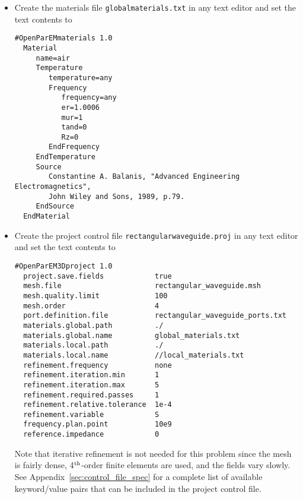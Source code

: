 \documentclass[titlepage]{article}
\renewcommand\_{\textunderscore\linebreak[1]}
\begin{document}
\begin{itemize}

\item Create the materials file \texttt{global\_materials.txt} in any text editor and set the text contents to
\begin{Verbatim}[fontsize=\small]
  #OpenParEMmaterials 1.0
  Material
     name=air
     Temperature
        temperature=any
        Frequency
           frequency=any
           er=1.0006
           mur=1
           tand=0
           Rz=0
        EndFrequency
     EndTemperature
     Source
        Constantine A. Balanis, "Advanced Engineering Electromagnetics",
        John Wiley and Sons, 1989, p.79.
     EndSource
  EndMaterial
\end{Verbatim}
\item Create the project control file \texttt{rectangular\_waveguide.proj} in any text editor and set the text contents to
\begin{Verbatim}[fontsize=\small]
  #OpenParEM3Dproject 1.0
  project.save.fields            true
  mesh.file                      rectangular_waveguide.msh
  mesh.quality.limit             100
  mesh.order                     4
  port.definition.file           rectangular_waveguide_ports.txt
  materials.global.path          ./
  materials.global.name          global_materials.txt
  materials.local.path           ./
  materials.local.name           //local_materials.txt
  refinement.frequency           none
  refinement.iteration.min       1
  refinement.iteration.max       5
  refinement.required.passes     1
  refinement.relative.tolerance  1e-4
  refinement.variable            S
  frequency.plan.point           10e9
  reference.impedance            0
\end{Verbatim}

\noindent Note that iterative refinement is not needed for this problem since the mesh is fairly dense, 4$^{\textnormal{th}}$-order finite elements are used, and the fields vary slowly.  See Appendix~\ref{sec:control_file_spec} for a complete list of available keyword/value pairs that can be included in the project control file.


\end{itemize}
\end{document}
